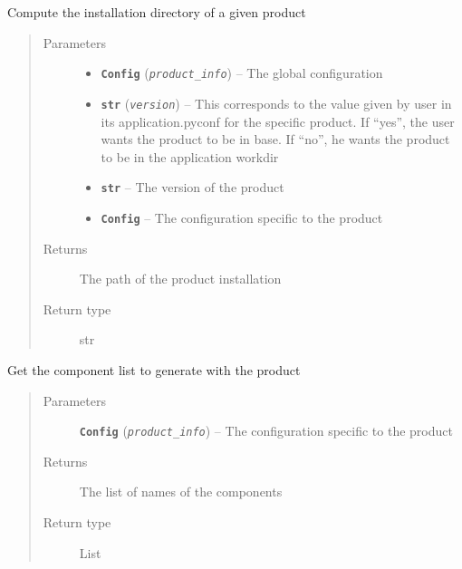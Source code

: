 \documentclass[a4paper,10pt,english]{sphinxmanual}
\begin{document}

\begin{fulllineitems}
\label{commands/apidoc/src:src.product.get_install_dir}
Compute the installation directory of a given product
\begin{quote}\begin{description}
\item[{Parameters}] \leavevmode\begin{itemize}
\item {} 
\textbf{\texttt{Config}} (\emph{\texttt{product\_info}}) -- The global configuration

\item {} 
\textbf{\texttt{str}} (\emph{\texttt{version}}) -- This corresponds to the value given by user in its application.pyconf for the specific product. If ``yes'', the user wants the product to be in base. If ``no'', he wants the product to be in the application workdir

\item {} 
\textbf{\texttt{str}} -- The version of the product

\item {} 
\textbf{\texttt{Config}} -- The configuration specific to the product

\end{itemize}

\item[{Returns}] \leavevmode
The path of the product installation

\item[{Return type}] \leavevmode
str

\end{description}\end{quote}

\end{fulllineitems}


\begin{fulllineitems}
\label{commands/apidoc/src:src.product.get_product_components}
Get the component list to generate with the product
\begin{quote}\begin{description}
\item[{Parameters}] \leavevmode
\textbf{\texttt{Config}} (\emph{\texttt{product\_info}}) -- The configuration specific to 
the product

\item[{Returns}] \leavevmode
The list of names of the components

\item[{Return type}] \leavevmode
List

\end{description}\end{quote}

\end{fulllineitems}
\end{document}

